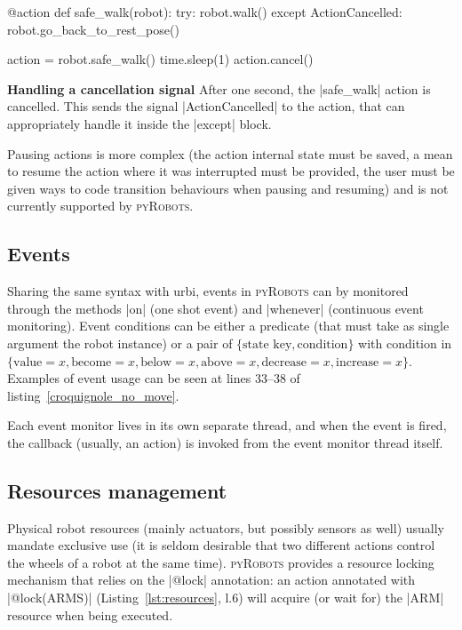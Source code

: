 \documentclass[a4paper, 10pt, conference]{ieeeconf}      %
\newcommand{\pyRobots}{\textsc{pyRobots}}
\begin{document}
\begin{listing}
\begin{pythoncode}
    @action
    def safe_walk(robot):
      try:
        robot.walk()
      except ActionCancelled:
        robot.go_back_to_rest_pose()

    action = robot.safe_walk()
    time.sleep(1)
    action.cancel()
\end{pythoncode}
\caption{\textbf{Handling a cancellation signal} After one second, the
\python|safe_walk| action is cancelled. This sends the signal
\python|ActionCancelled| to the action, that can appropriately handle it inside
the \python|except| block.}
\label{lst:signals}
\end{listing}

Pausing actions is more complex (the action internal state must be saved, a mean
to resume the action where it was interrupted must be provided, the user must be
given ways to code transition behaviours when pausing and resuming) and is not
currently supported by \pyRobots{}.

\subsection{Events}

Sharing the same syntax with {\sc urbi}, events in \pyRobots{} can by monitored
through the methods \python|on| (one shot event) and \python|whenever|
(continuous event monitoring). Event conditions can be either a predicate (that
must take as single argument the robot instance) or a pair of $\{\text{state
key}, \text{condition}\}$ with condition in $\{\text{value}=x, \text{become}=x,
\text{below}=x, \text{above}=x, \text{decrease}=x, \text{increase}=x\}$.
Examples of event usage can be seen at lines 33--38 of
listing~\ref{croquignole_no_move}.

Each event monitor lives in its own separate thread, and when the event is fired,
the callback (usually, an action) is invoked from the event monitor thread
itself.

\subsection{Resources management}

Physical robot resources (mainly actuators, but possibly sensors as
well) usually mandate exclusive use (it is seldom desirable that two different actions
control the wheels of a robot at the same time). \pyRobots{} provides a resource
locking mechanism that relies on the \python|@lock| annotation: an action
annotated with \python|@lock(ARMS)| (Listing~\ref{lst:resources}, l.6) will
acquire (or wait for) the \python|ARM| resource when being executed.
\end{document}

